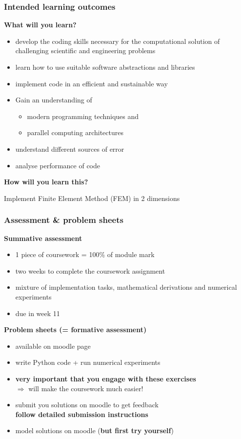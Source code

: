 \documentclass{beamer}
\begin{document}
\begin{frame}
\frametitle{Intended learning outcomes}
\textbf{What will you learn?}
\begin{itemize}
  \item develop the coding skills necessary for the computational solution of challenging scientific and engineering problems
  \item learn how to use suitable software abstractions and libraries
  \item implement code in an efficient and sustainable way
  \item Gain an understanding of
  \begin{itemize}
    \item modern programming techniques and
    \item parallel computing architectures 
  \end{itemize}  
  \item understand different sources of error
  \item analyse performance of code
\end{itemize}
\textbf{How will you learn this?}
\begin{center}
  Implement Finite Element Method (FEM) in 2 dimensions
\end{center}
\end{frame}


\begin{frame}
\frametitle{Assessment \& problem sheets}
\textbf{Summative assessment}
\begin{itemize}
\item 1 piece of coursework = 100\% of module mark
\item two weeks to complete the coursework assignment
\item mixture of implementation tasks, mathematical derivations and numerical experiments
\item due in week 11
\end{itemize}
\vspace{2ex}
\textbf{Problem sheets (= formative assessment)}
\begin{itemize}
  \item available on moodle page
  \item write Python code + run numerical experiments
  \item \textbf{very important that you engage with these exercises}\\
   $\Rightarrow$ will make the coursework much easier!
  \item submit you solutions on moodle to get feedback\\
  \textbf{follow detailed submission instructions}
  \item model solutions on moodle (\textbf{but first try yourself})
\end{itemize}
\end{frame}
\end{document}
